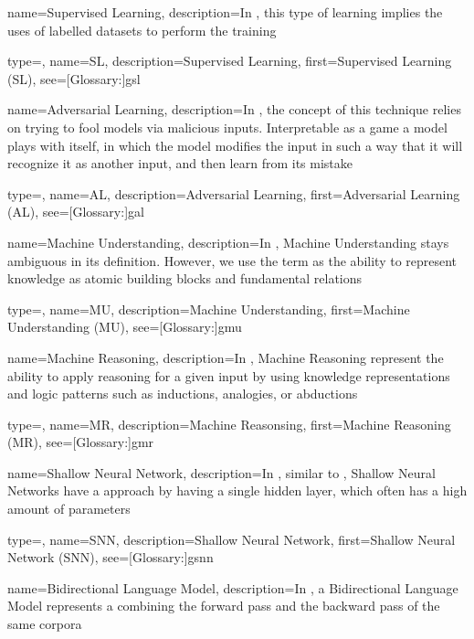 {
  name={Supervised Learning},
  description={In , this type of learning implies the uses of labelled datasets to perform the training}
}

{
  type=\acronymtype,
  name={SL},
  description={Supervised Learning},
  first={Supervised Learning (SL)},
  see=[Glossary:]{gsl}
}

{
  name={Adversarial Learning},
  description={In , the concept of this technique relies on trying to fool models via malicious inputs. Interpretable as a game a model plays with itself, in which the model modifies the input in such a way that it will recognize it as another input, and then learn from its mistake}
}

{
  type=\acronymtype,
  name={AL},
  description={Adversarial Learning},
  first={Adversarial Learning (AL)},
  see=[Glossary:]{gal}
}

{
  name={Machine Understanding},
  description={In , Machine Understanding stays ambiguous in its definition. However, we use the term as the ability to represent knowledge as atomic building blocks and fundamental relations}
}

{
  type=\acronymtype,
  name={MU},
  description={Machine Understanding},
  first={Machine Understanding (MU)},
  see=[Glossary:]{gmu}
}

{
  name={Machine Reasoning},
  description={In , Machine Reasoning represent the ability to apply reasoning for a given input by using knowledge representations and logic patterns such as inductions, analogies, or abductions}
}

{
  type=\acronymtype,
  name={MR},
  description={Machine Reasonsing},
  first={Machine Reasoning (MR)},
  see=[Glossary:]{gmr}
}


{
  name={Shallow Neural Network},
  description={In , similar to , Shallow Neural Networks have a  approach by having a single hidden layer, which often has a high amount of parameters}
}

{
  type=\acronymtype,
  name={SNN},
  description={Shallow Neural Network},
  first={Shallow Neural Network (SNN)},
  see=[Glossary:]{gsnn}
}


{
  name={Bidirectional Language Model},
  description={In , a Bidirectional Language Model represents a  combining the forward pass and the backward pass of the same corpora}
}

